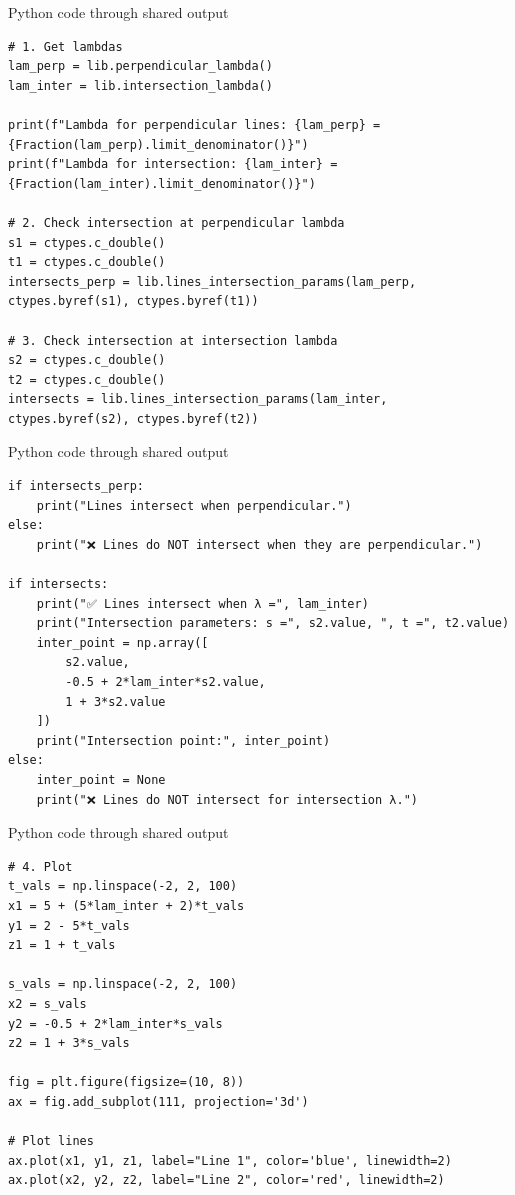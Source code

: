 \documentclass{beamer}
\begin{document}
  \begin{frame}[fragile]{Python code through shared output}
\begin{lstlisting}
# 1. Get lambdas
lam_perp = lib.perpendicular_lambda()
lam_inter = lib.intersection_lambda()

print(f"Lambda for perpendicular lines: {lam_perp} = {Fraction(lam_perp).limit_denominator()}")
print(f"Lambda for intersection: {lam_inter} = {Fraction(lam_inter).limit_denominator()}")

# 2. Check intersection at perpendicular lambda
s1 = ctypes.c_double()
t1 = ctypes.c_double()
intersects_perp = lib.lines_intersection_params(lam_perp, ctypes.byref(s1), ctypes.byref(t1))

# 3. Check intersection at intersection lambda
s2 = ctypes.c_double()
t2 = ctypes.c_double()
intersects = lib.lines_intersection_params(lam_inter, ctypes.byref(s2), ctypes.byref(t2))
\end{lstlisting}
\end{frame}
  \begin{frame}[fragile]{Python code through shared output}
\begin{lstlisting}
if intersects_perp:
    print("Lines intersect when perpendicular.")
else:
    print("❌ Lines do NOT intersect when they are perpendicular.")

if intersects:
    print("✅ Lines intersect when λ =", lam_inter)
    print("Intersection parameters: s =", s2.value, ", t =", t2.value)
    inter_point = np.array([
        s2.value,
        -0.5 + 2*lam_inter*s2.value,
        1 + 3*s2.value
    ])
    print("Intersection point:", inter_point)
else:
    inter_point = None
    print("❌ Lines do NOT intersect for intersection λ.")
\end{lstlisting}
\end{frame}
  \begin{frame}[fragile]{Python code through shared output}
\begin{lstlisting}
# 4. Plot
t_vals = np.linspace(-2, 2, 100)
x1 = 5 + (5*lam_inter + 2)*t_vals
y1 = 2 - 5*t_vals
z1 = 1 + t_vals

s_vals = np.linspace(-2, 2, 100)
x2 = s_vals
y2 = -0.5 + 2*lam_inter*s_vals
z2 = 1 + 3*s_vals

fig = plt.figure(figsize=(10, 8))
ax = fig.add_subplot(111, projection='3d')

# Plot lines
ax.plot(x1, y1, z1, label="Line 1", color='blue', linewidth=2)
ax.plot(x2, y2, z2, label="Line 2", color='red', linewidth=2)
\end{lstlisting}
\end{frame}
\end{document}
